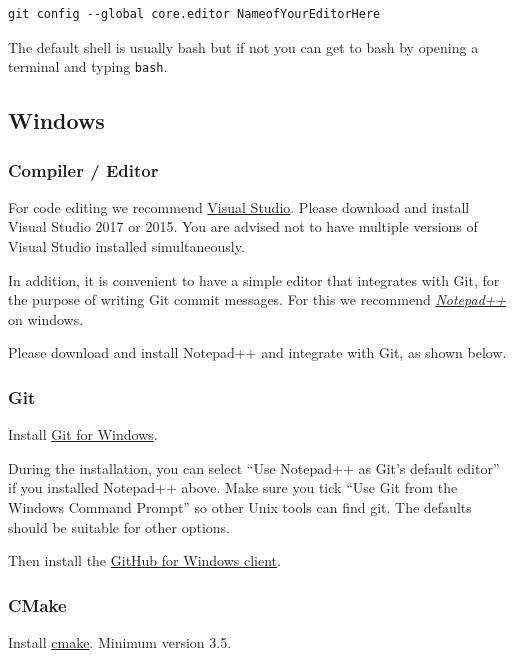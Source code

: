 \begin{verbatim}
git config --global core.editor NameofYourEditorHere
\end{verbatim}

The default shell is usually bash but if not you can get to bash by
opening a terminal and typing \texttt{bash}.

\subsection{Windows}\label{windows-1}

\subsubsection{Compiler / Editor}\label{compiler-editor}

For code editing we recommend
\href{https://visualstudio.microsoft.com/downloads/}{Visual Studio}.
Please download and install Visual Studio 2017 or 2015. You are advised
not to have multiple versions of Visual Studio installed simultaneously.

In addition, it is convenient to have a simple editor that integrates
with Git, for the purpose of writing Git commit messages. For this we
recommend \href{http://notepad-plus-plus.org/}{\emph{Notepad++}} on
windows.

Please download and install Notepad++ and integrate with Git, as shown
below.

\subsubsection{Git}\label{git-2}

Install \href{http://gitforwindows.org/}{Git for Windows}.

During the installation, you can select ``Use Notepad++ as Git's default
editor'' if you installed Notepad++ above. Make sure you tick ``Use Git
from the Windows Command Prompt'' so other Unix tools can find git. The
defaults should be suitable for other options.

Then install the \href{http://windows.github.com/}{GitHub for Windows
client}.

\subsubsection{CMake}\label{cmake-2}

Install
\href{http://www.cmake.org/cmake/resources/software.html}{cmake}.
Minimum version 3.5.

